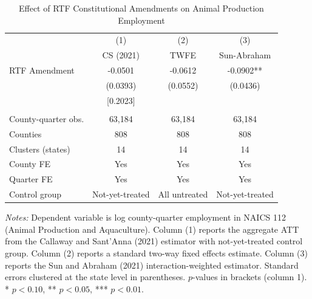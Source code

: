 \begin{table}[H]
\centering
\caption{Effect of RTF Constitutional Amendments on Animal Production Employment}
\label{tab:main}
\begin{threeparttable}
\begin{tabular}{lccc}
\toprule
 & (1) & (2) & (3) \\
 & CS (2021) & TWFE & Sun-Abraham \\
\midrule
RTF Amendment & -0.0501 & -0.0612 & -0.0902** \\
 & (0.0393) & (0.0552) & (0.0436) \\
 & [0.2023] & & \\
\\
County-quarter obs. & 63,184 & 63,184 & 63,184 \\
Counties & 808 & 808 & 808 \\
Clusters (states) & 14 & 14 & 14 \\
County FE & Yes & Yes & Yes \\
Quarter FE & Yes & Yes & Yes \\
Control group & Not-yet-treated & All untreated & Not-yet-treated \\
\bottomrule
\end{tabular}
\begin{tablenotes}[flushleft]
\small
\item \textit{Notes:} Dependent variable is log county-quarter employment in NAICS 112 (Animal Production and Aquaculture). Column (1) reports the aggregate ATT from the Callaway and Sant'Anna (2021) estimator with not-yet-treated control group. Column (2) reports a standard two-way fixed effects estimate. Column (3) reports the Sun and Abraham (2021) interaction-weighted estimator. Standard errors clustered at the state level in parentheses. $p$-values in brackets (column 1). * $p<0.10$, ** $p<0.05$, *** $p<0.01$.
\end{tablenotes}
\end{threeparttable}
\end{table}
